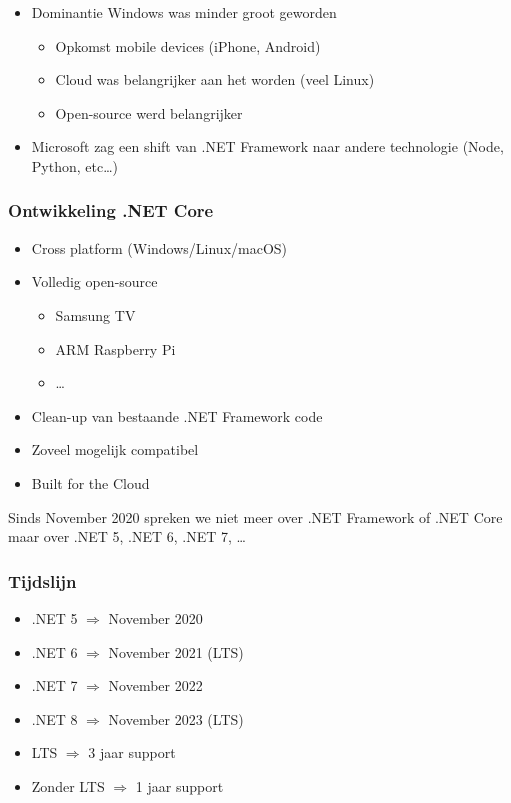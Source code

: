 \documentclass{article}
\begin{document}
\begin{itemize}
    \item Dominantie Windows was minder groot geworden
    \begin{itemize}
        \item Opkomst mobile devices (iPhone, Android)
        \item Cloud was belangrijker aan het worden (veel Linux)
        \item Open-source werd belangrijker
    \end{itemize}
    \item Microsoft zag een shift van .NET Framework naar andere technologie (Node, Python, etc\dots)
\end{itemize}

\subsubsection{Ontwikkeling .NET Core}

\begin{itemize}
    \item Cross platform (Windows/Linux/macOS)
    \item Volledig open-source
    \begin{itemize}
        \item Samsung TV
        \item ARM Raspberry Pi
        \item \dots
    \end{itemize}
    \item Clean-up van bestaande .NET Framework code
    \item Zoveel mogelijk compatibel
    \item Built for the Cloud
\end{itemize}

Sinds November 2020 spreken we niet meer over .NET Framework of .NET Core maar over .NET 5, .NET 6, .NET 7, \dots

\subsubsection{Tijdslijn}

\begin{itemize}
    \item .NET 5 $\Rightarrow$ November 2020
    \item .NET 6 $\Rightarrow$ November 2021 (LTS)
    \item .NET 7 $\Rightarrow$ November 2022
    \item .NET 8 $\Rightarrow$ November 2023 (LTS)
    \item LTS $\Rightarrow$ 3 jaar support
    \item Zonder LTS $\Rightarrow$ 1 jaar support
\end{itemize}
\end{document}

